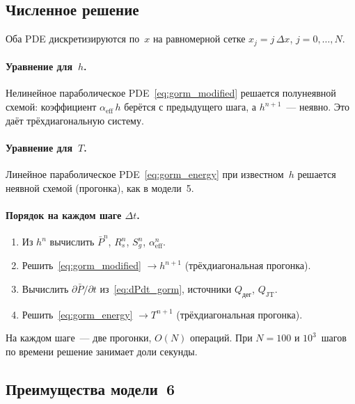 \documentclass[12pt,a4paper]{article}
\begin{document}
\subsection{Численное решение}

Оба PDE дискретизируются по~$x$ на равномерной сетке
$x_j = j\,\Delta x$, $j = 0, \ldots, N$.

\paragraph{Уравнение для~$h$.}
Нелинейное параболическое PDE~\eqref{eq:gorm_modified}
решается полунеявной схемой: коэффициент
$\alpha_{\mathrm{eff}}\,h$ берётся с предыдущего шага,
а $h^{n+1}$~--- неявно. Это даёт трёхдиагональную систему.

\paragraph{Уравнение для~$T$.}
Линейное параболическое PDE~\eqref{eq:gorm_energy} при известном~$h$
решается неявной схемой (прогонка), как в модели~5.

\paragraph{Порядок на каждом шаге $\Delta t$.}
\begin{enumerate}[nosep]
  \item Из $h^n$ вычислить $\bar{P}^n$, $R_s^n$, $S_g^n$,
        $\alpha_{\mathrm{eff}}^n$.
  \item Решить~\eqref{eq:gorm_modified} $\to h^{n+1}$
        (трёхдиагональная прогонка).
  \item Вычислить $\partial\bar{P}/\partial t$ из~\eqref{eq:dPdt_gorm},
        источники $Q_{\text{дег}}$, $Q_{\mathrm{JT}}$.
  \item Решить~\eqref{eq:gorm_energy} $\to T^{n+1}$
        (трёхдиагональная прогонка).
\end{enumerate}

На каждом шаге~--- две прогонки, $O(N)$ операций.
При $N = 100$ и $10^3$~шагов по времени решение занимает доли секунды.

\subsection{Преимущества модели~6}
\end{document}
